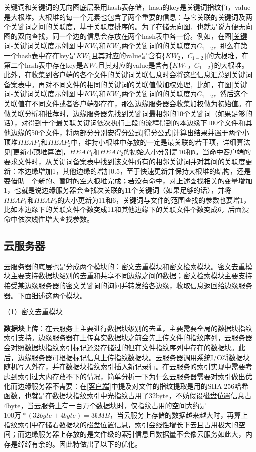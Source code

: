 \documentclass[promaster]{thesis-uestc}
\begin{document}
关键词和关键词的无向图底层采用hash表存储，hash的key是关键词指纹值，value是大根堆。大根堆的每一个元素也包含了两个重要的信息：与它关联的关键词及两个关键词之间的关联度，基于关联度排序的。为了存储无向图，也就是说方便无向图的双向查找，同一个边的信息会存放在两个hash表中各一份。例如，在图\ref{关键词-关键词关联度示例图}中$KW_1$和$KW_2$两个关键词的的关联度为$C_{1-2}$，那么在第一个hash表中存在key是$KW_1$且其对应的value是含有\{$KW_2$，$C_{1-2}$\}的大根堆，在第二个hash表中存在key是$KW_2$且其对应的value是含有\{$KW_1$，$C_{1-2}$\}的大根堆。此外，在收集到客户端的各个文件的关键词关联信息时会将这些信息汇总到关键词备案表中。再对不同文件的相同的关键词的关联值做加权处理，比如，在图\ref{关键词-关键词关联度示例图}中$KW_1$和$KW_2$两个关键词的的关联度为$C_{1-2}$，然后这个关联值在不同文件或者客户端都存在，那么边缘服务器会收集加权做为初始值。在做关联分析和推荐时，边缘服务器先找到关键词最相邻的10个关键词（如果足够的话），对得到十个最关联关键词依次执行上段的流程得到的本边缘下100个文件和其他边缘的50个文件，将两部分分别安得分公式\ref{得分公式}计算出结果并置于两个小顶堆$HEAP_1$和$HEAP_2$中，维持小根堆中存放的一定是最关联的若干项，详细算法见\ref{更新小顶堆算法}，$HEAP_1$和$HEAP_2$的初始大小分别是10和5。当命中客户端的要求文件时，从关键词备案表中找到该文件所有的相邻关键词并对其间的关联度更新：本边缘增加1，其他边缘的增加0.5，至于快速更新并保持大根堆的结构，还是要借助一个新的、暂时的空大根堆完成；若没有命中，对上述查找相关的变量增加1，也就是说边缘服务器会查找次关联的11个关键词（如果足够的话），并将$HEAP_1$和$HEAP_2$的大小更新为11和6，关键词与文件的范围查找的参数也要增1，比如本边缘下的关联文件个数变成11和其他边缘下的关联文件个数变成6，后面没命中依次线性增大查找参数。


\subsection{云服务器}\label{云服务的实现}
云服务器的底层也是分成两个模块的：密文去重模块和密文检索模块。密文去重模块主要支持数据块级别的去重和共享不同边缘之间的数据；密文检索模块主要支持接受某边缘服务器的密文关键词的询问并转发给各边缘，收取信息返回给边缘服务器。下面细述这两个模块。

（1）密文去重模块

\textbf{数据块上传}：在云服务上主要进行数据块级别的去重，主要需要全局的数据块指纹索引支持。边缘服务器在上传真实数据块之前会先上传文件的指纹序列，云服务器会对照数据块指纹索引标记还没存储过的但在文件指纹序列中存在的数据块。此后，边缘服务器可根据标记信息上传指纹数据块。云服务器调用系统I/O将数据块随机写入外存，并在数据块指纹索引插入新记录行。在云服务的索引实现中需要考虑到索引过大内存放不下的情况，简单分析一下为什么云服务器需要对索引做出优化而边缘服务器不需要：在\ref{客户端}中提及对文件的指纹提取是用的SHA-256哈希函数，也就是在数据块指纹索引中光指纹占用了32byte，不妨假设磁盘位置信息占4byte，当云服务上有一百万个数据块时，仅指纹占用的空间大约是$100万 * (32byte + 4byte) = 36MB$，当云服务上存储的数据越来越大时，再算上指纹索引中存储着数据块的磁盘位置信息，索引会线性增长下去且占用极大的空间；而边缘服务器上存放的是文件级的索引信息且数据量不会像云服务如此大，内存是绰绰有余的。因此特做出了以下的优化。
\end{document}
